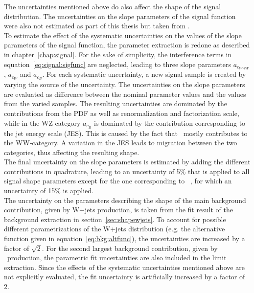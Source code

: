 The uncertainties mentioned above do also affect the shape of the signal distribution. The uncertainties on the slope parameters of the signal function were also not estimated as part of this thesis but taken from \cite{PAS}.\\

\noindent To estimate the effect of the systematic uncertainties on the values of the slope parameters of the signal function, the parameter extraction is redone as described in chapter~\ref{chap:signal}. For the sake of simplicity, the interference terms in equation~\ref{eq:signal:sigfunc} are neglected, leading to three slope parameters $a_{c_{WWW}}$, $a_{c_W}$ and $a_{c_B}$. For each systematic uncertainty, a new signal sample is created by varying the source of the uncertainty. The uncertainties on the slope parameters are evaluated as difference between the nominal parameter values and the values from the varied samples. The resulting uncertainties are dominated by the contributions from the PDF as well as renormalization and factorization scale, while in the WZ-category $a_{c_B}$ is dominated by the contribution corresponding to the jet energy scale (JES). This is caused by the fact that \Tcb \ mostly contributes to the WW-category. A variation in the JES leads to migration between the two categories, thus affecting the resulting shape.\\

\noindent The final uncertainty on the slope parameters is estimated by adding the different contributions in quadrature, leading to an uncertainty of 5\% that is applied to all signal shape parameters except for the one corresponding to \Tcb \ , for which an uncertainty of 15\% is applied.\\

\noindent The uncertainty on the parameters describing the shape of the main background contribution, given by W+jets production, is taken from the fit result of the background extraction in section~\ref{sec:shapewjets}. To account for possible different parametrizations of the W+jets distribution (e.g. the alternative function given in equation~\ref{eq:bkg:altfunc}), the uncertainties are increased by a factor of $\sqrt{2}$. For the second largest background contribution, given by \ttbar \ production, the parametric fit uncertainties are also included in the limit extraction. Since the effects of the systematic uncertainties mentioned above are not explicitly evaluated, the fit uncertainty is artificially increased by a factor of 2.


